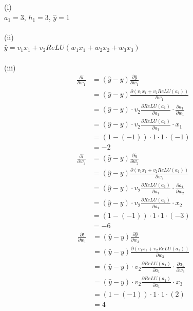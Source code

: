 \documentclass[11pt]{article}
\begin{document}
\begin{enumerate}
\begin{answertext}{22cm}{}
(i) \\
$a_{1} = 3$, $h_{1} = 3$, $\hat{y} = 1$ \\
\\
(ii) \\
$\hat{y} = v_{1}x_{1} + v_{2}ReLU(w_{1}x_{1} + w_{2}x_{2} + w_{3}x_{3})$ \\
\\
(iii) \\
\begin{align*}
\frac{\partial{l}}{\partial{w_{1}}} &= (\hat{y} - y) \frac{\partial{\hat{y}}}{\partial{w_{1}}} \\
&= (\hat{y} - y) \frac{\partial{(v_{1}x_{1} + v_{2}ReLU(a_{1}))}}{\partial{w_{1}}} \\
&= (\hat{y} - y) \cdot v_{2} \frac{\partial{ReLU(a_{1})}}{\partial{a_{1}}} \cdot \frac{\partial{a_{1}}}{\partial{w_{1}}} \\
&= (\hat{y} - y) \cdot v_{2} \frac{\partial{ReLU(a_{1})}}{\partial{a_{1}}} \cdot x_{1} \\
&= (1 - (-1)) \cdot 1 \cdot 1 \cdot (-1) \\
&= -2
\end{align*}
\begin{align*}
\frac{\partial{l}}{\partial{w_{2}}} &= (\hat{y} - y) \frac{\partial{\hat{y}}}{\partial{w_{2}}} \\
&= (\hat{y} - y) \frac{\partial{(v_{1}x_{1} + v_{2}ReLU(a_{1}))}}{\partial{w_{2}}} \\
&= (\hat{y} - y) \cdot v_{2} \frac{\partial{ReLU(a_{1})}}{\partial{a_{1}}} \cdot \frac{\partial{a_{1}}}{\partial{w_{2}}} \\
&= (\hat{y} - y) \cdot v_{2} \frac{\partial{ReLU(a_{1})}}{\partial{a_{1}}} \cdot x_{2} \\
&= (1 - (-1)) \cdot 1 \cdot 1 \cdot (-3) \\
&= -6
\end{align*}
\begin{align*}
\frac{\partial{l}}{\partial{w_{1}}} &= (\hat{y} - y) \frac{\partial{\hat{y}}}{\partial{w_{3}}} \\
&= (\hat{y} - y) \frac{\partial{(v_{1}x_{1} + v_{2}ReLU(a_{1}))}}{\partial{w_{3}}} \\
&= (\hat{y} - y) \cdot v_{2} \frac{\partial{ReLU(a_{1})}}{\partial{a_{1}}} \cdot \frac{\partial{a_{1}}}{\partial{w_{3}}} \\
&= (\hat{y} - y) \cdot v_{2} \frac{\partial{ReLU(a_{1})}}{\partial{a_{1}}} \cdot x_{3} \\
&= (1 - (-1)) \cdot 1 \cdot 1 \cdot (2) \\
&= 4
\end{align*}
  

\end{answertext}
\end{enumerate}
\end{document}
